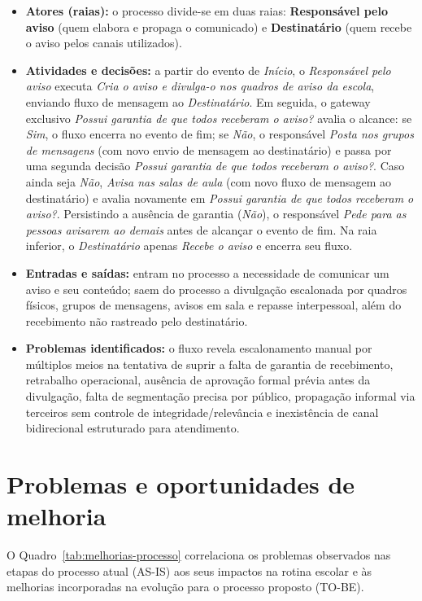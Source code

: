 \documentclass[a4paper,12pt]{report}
\begin{document}
\begin{itemize}
    \item \textbf{Atores (raias):} o processo divide-se em duas raias: \textbf{Responsável pelo aviso} (quem elabora e propaga o comunicado) e \textbf{Destinatário} (quem recebe o aviso pelos canais utilizados).
    \item \textbf{Atividades e decisões:} a partir do evento de \textit{Início}, o \textit{Responsável pelo aviso} executa \textit{Cria o aviso e divulga-o nos quadros de aviso da escola}, enviando fluxo de mensagem ao \textit{Destinatário}. Em seguida, o gateway exclusivo \textit{Possui garantia de que todos receberam o aviso?} avalia o alcance: se \textit{Sim}, o fluxo encerra no evento de fim; se \textit{Não}, o responsável \textit{Posta nos grupos de mensagens} (com novo envio de mensagem ao destinatário) e passa por uma segunda decisão \textit{Possui garantia de que todos receberam o aviso?}. Caso ainda seja \textit{Não}, \textit{Avisa nas salas de aula} (com novo fluxo de mensagem ao destinatário) e avalia novamente em \textit{Possui garantia de que todos receberam o aviso?}. Persistindo a ausência de garantia (\textit{Não}), o responsável \textit{Pede para as pessoas avisarem ao demais} antes de alcançar o evento de fim. Na raia inferior, o \textit{Destinatário} apenas \textit{Recebe o aviso} e encerra seu fluxo.
    \item \textbf{Entradas e saídas:} entram no processo a necessidade de comunicar um aviso e seu conteúdo; saem do processo a divulgação escalonada por quadros físicos, grupos de mensagens, avisos em sala e repasse interpessoal, além do recebimento não rastreado pelo destinatário.
    \item \textbf{Problemas identificados:} o fluxo revela escalonamento manual por múltiplos meios na tentativa de suprir a falta de garantia de recebimento, retrabalho operacional, ausência de aprovação formal prévia antes da divulgação, falta de segmentação precisa por público, propagação informal via terceiros sem controle de integridade/relevância e inexistência de canal bidirecional estruturado para atendimento.
\end{itemize}

\section{Problemas e oportunidades de melhoria}

O Quadro~\ref{tab:melhorias-processo} correlaciona os problemas observados nas etapas do processo atual (AS-IS) aos seus impactos na rotina escolar e às melhorias incorporadas na evolução para o processo proposto (TO-BE).
\end{document}
